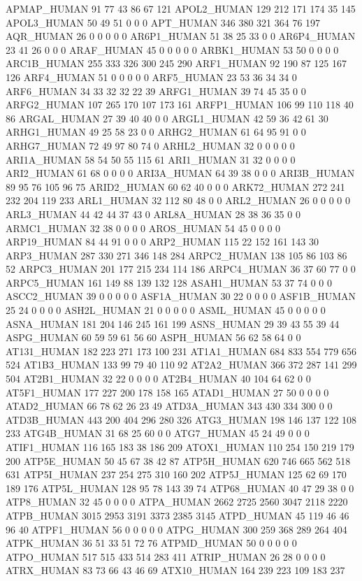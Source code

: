 APMAP_HUMAN	91	77	43	86	67	121
APOL2_HUMAN	129	212	171	174	35	145
APOL3_HUMAN	50	49	51	0	0	0
APT_HUMAN	346	380	321	364	76	197
AQR_HUMAN	26	0	0	0	0	0
AR6P1_HUMAN	51	38	25	33	0	0
AR6P4_HUMAN	23	41	26	0	0	0
ARAF_HUMAN	45	0	0	0	0	0
ARBK1_HUMAN	53	50	0	0	0	0
ARC1B_HUMAN	255	333	326	300	245	290
ARF1_HUMAN	92	190	87	125	167	126
ARF4_HUMAN	51	0	0	0	0	0
ARF5_HUMAN	23	53	36	34	34	0
ARF6_HUMAN	34	33	32	32	22	39
ARFG1_HUMAN	39	74	45	35	0	0
ARFG2_HUMAN	107	265	170	107	173	161
ARFP1_HUMAN	106	99	110	118	40	86
ARGAL_HUMAN	27	39	40	40	0	0
ARGL1_HUMAN	42	59	36	42	61	30
ARHG1_HUMAN	49	25	58	23	0	0
ARHG2_HUMAN	61	64	95	91	0	0
ARHG7_HUMAN	72	49	97	80	74	0
ARHL2_HUMAN	32	0	0	0	0	0
ARI1A_HUMAN	58	54	50	55	115	61
ARI1_HUMAN	31	32	0	0	0	0
ARI2_HUMAN	61	68	0	0	0	0
ARI3A_HUMAN	64	39	38	0	0	0
ARI3B_HUMAN	89	95	76	105	96	75
ARID2_HUMAN	60	62	40	0	0	0
ARK72_HUMAN	272	241	232	204	119	233
ARL1_HUMAN	32	112	80	48	0	0
ARL2_HUMAN	26	0	0	0	0	0
ARL3_HUMAN	44	42	44	37	43	0
ARL8A_HUMAN	28	38	36	35	0	0
ARMC1_HUMAN	32	38	0	0	0	0
AROS_HUMAN	54	45	0	0	0	0
ARP19_HUMAN	84	44	91	0	0	0
ARP2_HUMAN	115	22	152	161	143	30
ARP3_HUMAN	287	330	271	346	148	284
ARPC2_HUMAN	138	105	86	103	86	52
ARPC3_HUMAN	201	177	215	234	114	186
ARPC4_HUMAN	36	37	60	77	0	0
ARPC5_HUMAN	161	149	88	139	132	128
ASAH1_HUMAN	53	37	74	0	0	0
ASCC2_HUMAN	39	0	0	0	0	0
ASF1A_HUMAN	30	22	0	0	0	0
ASF1B_HUMAN	25	24	0	0	0	0
ASH2L_HUMAN	21	0	0	0	0	0
ASML_HUMAN	45	0	0	0	0	0
ASNA_HUMAN	181	204	146	245	161	199
ASNS_HUMAN	29	39	43	55	39	44
ASPG_HUMAN	60	59	59	61	56	60
ASPH_HUMAN	56	62	58	64	0	0
AT131_HUMAN	182	223	271	173	100	231
AT1A1_HUMAN	684	833	554	779	656	524
AT1B3_HUMAN	133	99	79	40	110	92
AT2A2_HUMAN	366	372	287	141	299	504
AT2B1_HUMAN	32	22	0	0	0	0
AT2B4_HUMAN	40	104	64	62	0	0
AT5F1_HUMAN	177	227	200	178	158	165
ATAD1_HUMAN	27	50	0	0	0	0
ATAD2_HUMAN	66	78	62	26	23	49
ATD3A_HUMAN	343	430	334	300	0	0
ATD3B_HUMAN	443	200	404	296	280	326
ATG3_HUMAN	198	146	137	122	108	233
ATG4B_HUMAN	31	68	25	60	0	0
ATG7_HUMAN	45	24	49	0	0	0
ATIF1_HUMAN	116	165	183	38	186	209
ATOX1_HUMAN	110	254	150	219	179	200
ATP5E_HUMAN	50	45	67	38	42	87
ATP5H_HUMAN	620	746	665	562	518	631
ATP5I_HUMAN	237	254	275	310	160	202
ATP5J_HUMAN	125	62	69	170	189	176
ATP5L_HUMAN	128	95	78	143	39	74
ATP68_HUMAN	40	47	29	38	0	0
ATP8_HUMAN	32	45	0	0	0	0
ATPA_HUMAN	2662	2725	2560	3047	2118	2220
ATPB_HUMAN	3015	2953	3191	3373	2385	3145
ATPD_HUMAN	45	119	46	46	96	40
ATPF1_HUMAN	56	0	0	0	0	0
ATPG_HUMAN	300	259	368	289	264	404
ATPK_HUMAN	36	51	33	51	72	76
ATPMD_HUMAN	50	0	0	0	0	0
ATPO_HUMAN	517	515	433	514	283	411
ATRIP_HUMAN	26	28	0	0	0	0
ATRX_HUMAN	83	73	66	43	46	69
ATX10_HUMAN	164	239	223	109	183	237
